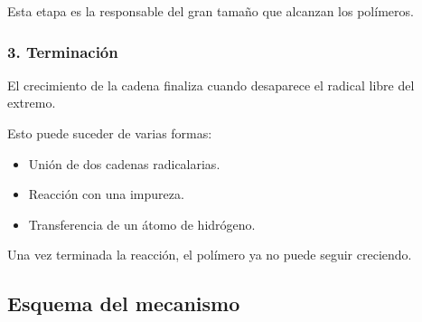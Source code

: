 Esta etapa es la responsable del gran tamaño que alcanzan los polímeros.


\subsubsection*{3. Terminación}

El crecimiento de la cadena finaliza cuando desaparece el radical libre del extremo.

Esto puede suceder de varias formas:

\begin{itemize}

\item Unión de dos cadenas radicalarias.

\item Reacción con una impureza.

\item Transferencia de un átomo de hidrógeno.

\end{itemize}

Una vez terminada la reacción, el polímero ya no puede seguir creciendo.


\subsection{Esquema del mecanismo}

\begin{center}


\end{center}



